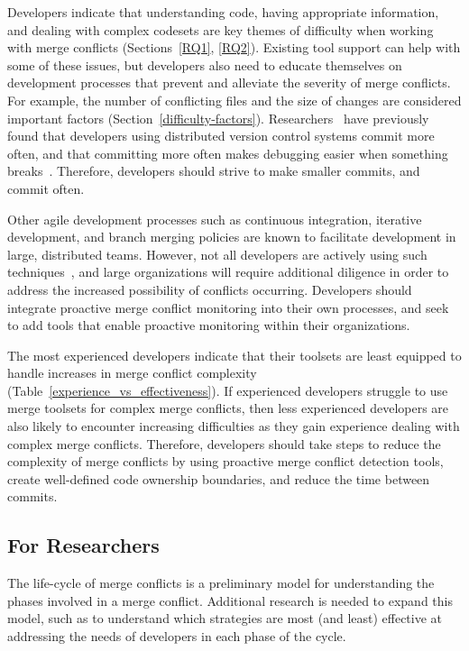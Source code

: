 Developers indicate that understanding code, having appropriate information, and dealing with complex codesets are key themes of difficulty when working with merge conflicts (Sections~\ref{RQ1}, \ref{RQ2}).
Existing tool support can help with some of these issues, but developers also need to educate themselves on development processes that prevent and alleviate the severity of merge conflicts.
For example, the number of conflicting files and the size of changes are considered important factors (Section~\ref{difficulty-factors}).
Researchers~\cite{brindescu2014versioncontrol} have previously found that developers using distributed version control systems commit more often, and that committing more often makes debugging easier when something breaks~\cite{meyer2014continuous}.
Therefore, developers should strive to make smaller commits, and commit often.

Other agile development processes such as continuous integration, iterative development, and branch merging policies are known to facilitate development in large, distributed teams.
However, not all developers are actively using such techniques~\cite{phillips2011branching}, and large organizations will require additional diligence in order to address the increased possibility of conflicts occurring.
Developers should integrate proactive merge conflict monitoring into their own processes, and seek to add tools that enable proactive monitoring within their organizations.

The most experienced developers indicate that their toolsets are least equipped to handle increases in merge conflict complexity (Table~\ref{experience_vs_effectiveness}).
If experienced developers struggle to use merge toolsets for complex merge conflicts, then less experienced developers are also likely to encounter increasing difficulties as they gain experience dealing with complex merge conflicts.
Therefore, developers should take steps to reduce the complexity of merge conflicts by using proactive merge conflict detection tools, create well-defined code ownership boundaries, and reduce the time between commits.

\subsection{For Researchers}
The life-cycle of merge conflicts is a preliminary model for understanding the phases involved in a merge conflict.
Additional research is needed to expand this model, such as to understand which strategies are most (and least) effective at addressing the needs of developers in each phase of the cycle.

